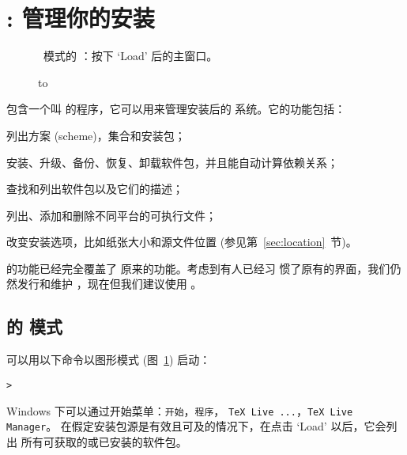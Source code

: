 \documentclass{article}
\begin{document}
\section{: 管理你的安装}
\label{sec:tlmgr}


\begin{figure}[tb]
\caption{\GUI\ 模式的 ：按下 `Load' 后的主窗口。}
\label{fig:tlmgr-gui}
\end{figure}

\begin{figure}[tb]
\hbox to 
\end{figure}

\TL{} 包含一个叫  的程序，它可以用来管理安装后的
系统。它的功能包括：

\begin{itemize*}
\item 列出方案 (scheme)，集合和安装包；
\item 安装、升级、备份、恢复、卸载软件包，并且能自动计算依赖关系；
\item 查找和列出软件包以及它们的描述；
\item 列出、添加和删除不同平台的可执行文件；
\item 改变安装选项，比如纸张大小和源文件位置 (参见第~\ref{sec:location}~节)。
\end{itemize*}

 的功能已经完全覆盖了  原来的功能。考虑到有人已经习
惯了原有的界面，我们仍然发行和维护 ，现在但我们建议使用
。

\subsection{ 的 \GUI{} 模式}
 可以用以下命令以图形模式 (图~\ref{fig:tlmgr-gui}) 启动：
\begin{alltt}
> 
\end{alltt}
Windows 下可以通过开始菜单：\texttt{开始}，\texttt{程序}，
\texttt{TeX Live ...}，\texttt{TeX Live Manager}。
在假定安装包源是有效且可及的情况下，在点击 `Load' 以后，它会列出
所有可获取的或已安装的软件包。
\end{document}
